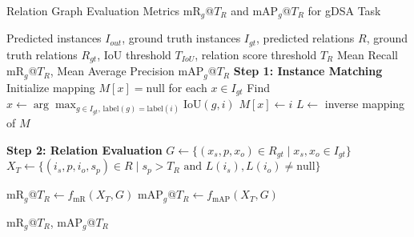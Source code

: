 \vspace{-6px}
\begin{algorithm}[htb]
\small
\renewcommand{\algorithmicrequire}{\textbf{Input:}}
\renewcommand{\algorithmicensure}{\textbf{Output:}}
\caption{Relation Graph Evaluation Metrics $\text{mR}_g$@$T_{R}$ and $\text{mAP}_g$@$T_{R}$ for gDSA Task}
\label{alg:metric}
\begin{algorithmic}[1]
    \Require Predicted instances $I_{out}$, ground truth instances $I_{gt}$, predicted relations $R$, ground truth relations $R_{gt}$, IoU threshold $T_{IoU}$, relation score threshold $T_{R}$
    \Ensure Mean Recall $\text{mR}_g$@$T_{R}$, Mean Average Precision $\text{mAP}_g$@$T_{R}$
    \State \textbf{Step 1: Instance Matching}
    \State Initialize mapping $M[x] = \text{null}$ for each $x \in I_{gt}$
        \State Find $x \gets \arg\max_{g \in I_{gt}, \, \text{label}(g) = \text{label}(i)} \text{IoU}(g, i)$
            \State $M[x] \gets i$
        \EndIf
    \EndFor
    \State $L \gets$ inverse mapping of $M$
    
    \State \textbf{Step 2: Relation Evaluation}
    \State $G \gets \{(x_s, p, x_o) \in R_{gt} \mid x_s, x_o \in I_{gt}\}$ 
    \State $X_T \gets \{(i_s, p, i_o, s_p) \in R \mid s_p > T_{R} \text{ and } L(i_s), L(i_o) \neq \text{null}\}$ 
    
    \State $\text{mR}_g$@$T_{R} \gets f_{\text{mR}}(X_T, G)$ 
    \State $\text{mAP}_g$@$T_{R} \gets f_{\text{mAP}}(X_T, G)$ 
    
    \State \Return $\text{mR}_g$@$T_{R}$, $\text{mAP}_g$@$T_{R}$
\end{algorithmic}
\end{algorithm}
\vspace{-20px}